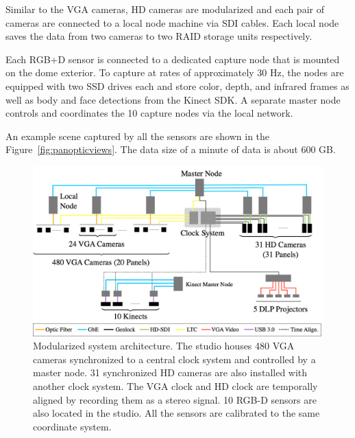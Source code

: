 Similar to the VGA cameras, HD cameras are modularized and each pair of cameras are connected to a local node machine via SDI cables. Each local node saves the data from two cameras to two RAID storage units respectively.


Each RGB+D sensor is connected to a dedicated capture node that is mounted on the dome exterior. To capture at rates of approximately 30 Hz, the nodes are equipped with two SSD drives each and store color, depth, and infrared frames as well as body and face detections from the Kinect SDK. A separate master node controls and coordinates the 10 capture nodes via the local network.

An example scene captured by all the sensors are shown in the Figure~\ref{fig:panopticviews}. The data size of a minute of data is about 600 GB. 

\begin{figure}[t]
	\includegraphics[width=\linewidth]{figures/Dome_architecture_0815}
	\caption{Modularized system architecture. The studio houses 480 VGA cameras synchronized to a central clock system and controlled by a master node. 31 synchronized HD cameras are also installed with another clock system. The VGA clock and HD clock are temporally aligned by recording them as a stereo signal. 10 RGB-D sensors are also located in the studio. All the sensors are calibrated to the same coordinate system.}
	\label{fig:architecture}
\end{figure}


